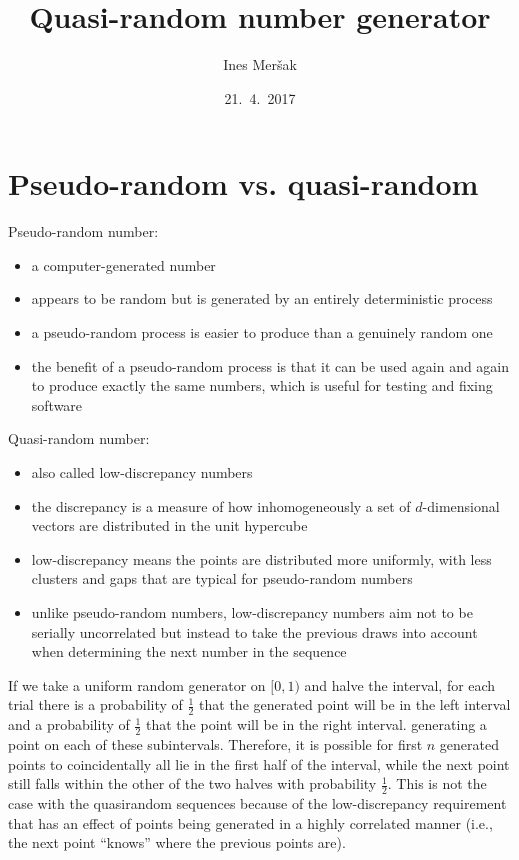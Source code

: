 \documentclass[11pt]{article}
\title{Quasi-random number generator}
\author{Ines Meršak}
\date{21.~4.~2017}
\begin{document}
    \maketitle

\section{Pseudo-random vs. quasi-random}
    Pseudo-random number:
    \begin{itemize}
        \item a computer-generated number
        \item appears to be random but is generated by an entirely deterministic process
        \item a pseudo-random process is easier to produce than a genuinely random one
        \item the benefit of a pseudo-random process is that it can be used again and again to produce exactly the same numbers, which is useful for testing and fixing software
    \end{itemize}

    Quasi-random number:
    \begin{itemize}
        \item also called low-discrepancy numbers
        \item the discrepancy is a measure of how inhomogeneously a set of $d$-dimensional vectors are distributed in the unit hypercube
        \item low-discrepancy means the points are distributed more uniformly, with less clusters and gaps that are typical for pseudo-random numbers
        \item unlike pseudo-random numbers, low-discrepancy numbers aim not to be serially uncorrelated but instead to take the previous draws into account when determining the next number in the sequence
    \end{itemize}
If we take a uniform random generator on $[0,1)$ and halve the interval, for each trial there is a probability of $\frac{1}{2}$ that the generated point will be in the left interval and a probability of $\frac{1}{2}$ that the point will be in the right interval. generating a point on each of these subintervals. 
Therefore, it is possible for first $n$ generated points to coincidentally all lie in the first half of the interval, while the next point still falls within the other of the two halves with probability $\frac{1}{2}$. This is not the case with the quasirandom sequences because of the low-discrepancy requirement that has an effect of points being generated in a highly correlated manner (i.e., the next point ``knows'' where the previous points are).
\end{document}
